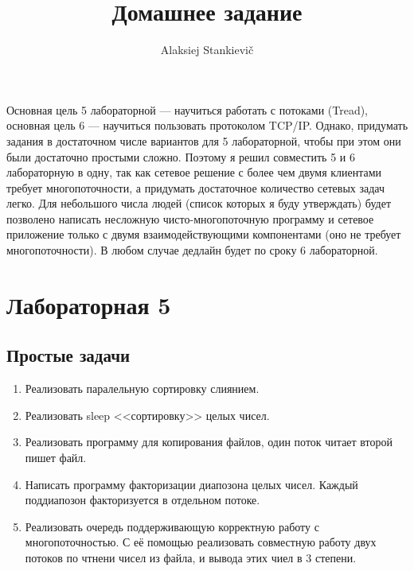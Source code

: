 \documentclass[12pt]{article}
\author{Alaksiej Stankievič}
\title{Домашнее задание}
\begin{document}

Основная цель 5 лабораторной --- научиться работать с потоками (Tread), 
основная цель 6 --- научиться пользовать протоколом TCP/IP. Однако,  придумать 
задания в достаточном числе вариантов для 5 лабораторной, чтобы при этом они 
были достаточно простыми сложно. Поэтому я решил совместить 5 и 6 лабораторную 
в одну, так как сетевое решение с более чем двумя клиентами требует 
многопоточности, а придумать достаточное количество сетевых задач легко. Для 
небольшого числа людей (список которых я буду утверждать) будет позволено 
написать несложную чисто-многопоточную программу и сетевое приложение только с 
двумя взаимодействующими компонентами (оно не требует многопоточности). В любом 
случае дедлайн будет по сроку 6 лабораторной.

\section*{Лабораторная 5}
\subsection*{Простые задачи}


\begin{enumerate}
	\item Реализовать паралельную сортировку слиянием.
	\item Реализовать sleep <<сортировку>> целых чисел.
	\item Реализовать программу для копирования файлов, один поток читает 
второй пишет файл.
	\item Написать программу факторизации диапозона целых чисел. Каждый 
поддиапозон факторизуется в отдельном потоке.
	\item Реализовать очередь поддерживающую корректную работу с 
многопоточностью. С её помощью реализовать совместную работу двух потоков по 
чтнени чисел из файла, и вывода этих чиел в 3 степени.
\end{enumerate}
\end{document}
